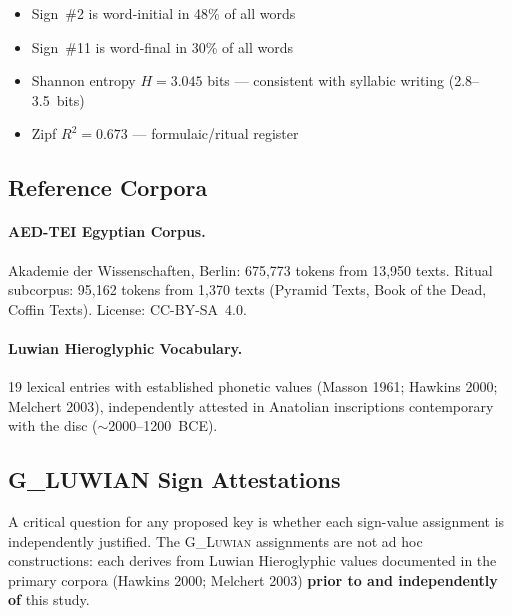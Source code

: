 \documentclass[12pt,a4paper]{article}
\begin{document}
\begin{itemize}
    \item Sign~\#2 is word-initial in 48\% of all words
    \item Sign~\#11 is word-final in 30\% of all words
    \item Shannon entropy $H = 3.045$ bits — consistent with syllabic writing (2.8--3.5~bits)
    \item Zipf $R^2 = 0.673$ — formulaic/ritual register
\end{itemize}

\subsection{Reference Corpora}

\paragraph{AED-TEI Egyptian Corpus.}
Akademie der Wissenschaften, Berlin: 675,773 tokens from 13,950 texts. Ritual subcorpus: 95,162 tokens from 1,370 texts (Pyramid Texts, Book of the Dead, Coffin Texts). License: CC-BY-SA~4.0.

\paragraph{Luwian Hieroglyphic Vocabulary.}
19 lexical entries with established phonetic values (Masson 1961; Hawkins 2000; Melchert 2003), independently attested in Anatolian inscriptions contemporary with the disc ($\sim$2000--1200~BCE).

\subsection{G\_LUWIAN Sign Attestations}

A critical question for any proposed key is whether each sign-value assignment is independently justified. The \textsc{G\_Luwian} assignments are not ad hoc constructions: each derives from Luwian Hieroglyphic values documented in the primary corpora (Hawkins 2000; Melchert 2003) \textbf{prior to and independently of} this study.
\end{document}
